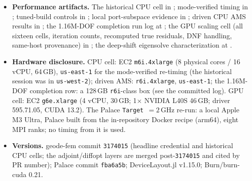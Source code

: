 \documentclass{anvil-paper}
\begin{document}
\begin{itemize}
    \texttt{p2\_cycles10\_resolution\_corrected/}) holds a generated
    \texttt{summary.toml} with the optimizer steps, the final
    finite-difference checks, the held-out series and every bound and
    estimate with its rounding direction, plus the Palace
    configurations, logs and outputs; \texttt{validation\_summary.json}
    is a hand-assembled index of the same numbers, and the directory's
    \texttt{README.md} gives the commands (about 20 and 10 minutes
    locally, with peak resident memory up to $29.4$ and $26.0$\,GB).
    The coarse-mesh runs: the single-parameter FD validation and
    bounded anchor attempt in
    ; harmonic motion
    in ; the
    three-parameter gradients in
    ; and the
    bounded optimizer runs in
    . All are
    consumed by ,
    which pins both \texttt{summary.toml} files and re-derives their
    bounds and estimates.
  \item \textbf{Performance artifacts.} The historical CPU cell in
    ; mode-verified
    timing in
    ;
    tuned-build controls in
    ;
    local port-subspace evidence in
    ;
    driven CPU AMS results in
    ; the 1.16M-DOF
    completion run log at
    ;
    the GPU scaling cell (all sixteen cells, iteration counts,
    recomputed true residuals, DNF handling, same-host provenance) in
    ; the deep-shift
    eigensolve characterization at
    .
  \item \textbf{Hardware disclosure.} CPU cell: EC2 \texttt{m6i.4xlarge}
    (8 physical cores / 16 vCPU, 64\,GB), \texttt{us-east-1} for the
    mode-verified re-timing (the historical session was in
    \texttt{us-west-2}); driven AMS: \texttt{r6i.4xlarge},
    \texttt{us-east-1}; the
    1.16M-DOF completion row: a 128\,GB \texttt{r6i}-class box (see the
    committed log). GPU cell: EC2 \texttt{g6e.xlarge} (4 vCPU, 30\,GB;
    1$\times$ NVIDIA L40S 46\,GB; driver 595.71.05, CUDA 13.2). The
    Palace \texttt{Target}~$= 2$\,GHz re-run: a local Apple M3 Ultra,
    Palace built from the in-repository Docker recipe (arm64), eight MPI
    ranks; no timing from it is used.
  \item \textbf{Versions.} geode-fem commit \texttt{3174015} (headline
    credential and historical CPU cells; the adjoint/diffopt layers are merged
    post-\texttt{3174015} and cited by PR number); Palace commit
    \texttt{fba6a5b}; DeviceLayout.jl v1.15.0; Burn/burn-cuda 0.21.
\end{itemize}
\end{document}
